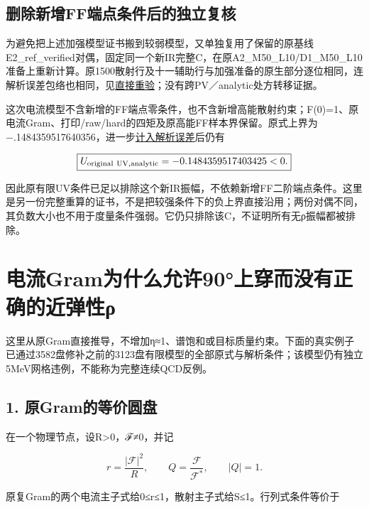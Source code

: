 \documentclass[
  10pt,
  a4paper,
]{article}
\begin{document}
\subsection{删除新增FF端点条件后的独立复核}\label{ux5220ux9664ux65b0ux589effux7aefux70b9ux6761ux4ef6ux540eux7684ux72ecux7acbux590dux6838}

为避免把上述加强模型证书搬到较弱模型，又单独复用了保留的原基线E2\_ref\_verified对偶，固定同一个新IR完整C，在原A2\_M50\_L10/D1\_M50\_L10准备上重新计算。原1500散射行及十一辅助行与加强准备的原生部分逐位相同，连解析误差包络也相同，见\href{../../../ORIGINAL_NATIVE_PREFIX_REPLAY.json}{直接重验}；没有跨PV／analytic处方转移证据。

这次电流模型不含新增的FF端点零条件，也不含新增高能散射约束；F(0)=1、原电流Gram、打印/raw/hard的四矩及原高能FF样本界保留。原式上界为−.1484359517640356，进一步\href{../../../original_UV_fixed_new_IR_analytic/report.json}{计入解析误差}后仍有

\[
\boxed{U_{\rm original\ UV,analytic}=-0.1484359517403425<0.}
\]

因此原有限UV条件已足以排除这个新IR振幅，不依赖新增FF二阶端点条件。这里是另一份完整重算的证书，不是把较强条件下的负上界直接沿用；两份对偶不同，其负数大小也不用于度量条件强弱。它仍只排除该C，不证明所有无ρ振幅都被排除。

\newpage

\section{电流Gram为什么允许90°上穿而没有正确的近弹性ρ}\label{ux7535ux6d41gramux4e3aux4ec0ux4e48ux5141ux8bb890ux4e0aux7a7fux800cux6ca1ux6709ux6b63ux786eux7684ux8fd1ux5f39ux6027ux3c1}

这里从原Gram直接推导，不增加η≈1、谱饱和或目标质量约束。下面的真实例子已通过3582盘修补之前的3123盘有限模型的全部原式与解析条件；该模型仍有独立5MeV网格违例，不能称为完整连续QCD反例。

\subsection{1.
原Gram的等价圆盘}\label{ux539fgramux7684ux7b49ux4ef7ux5706ux76d8}

在一个物理节点，设R\textgreater0，ℱ≠0，并记

\[
r=\frac{|\mathcal F|^2}{R},\qquad Q=\frac{\mathcal F}{\mathcal F^*},\qquad |Q|=1.
\]

原复Gram的两个电流主子式给0≤r≤1，散射主子式给\textbar S\textbar≤1。行列式条件等价于
\end{document}
